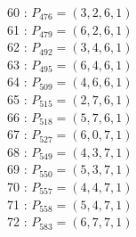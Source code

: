 \documentclass{article}
\begin{document}
{\begin{multicols}{3}
60 : $P_{476}=( 3, 2, 6, 1 )$\\
61 : $P_{479}=( 6, 2, 6, 1 )$\\
62 : $P_{492}=( 3, 4, 6, 1 )$\\
63 : $P_{495}=( 6, 4, 6, 1 )$\\
64 : $P_{509}=( 4, 6, 6, 1 )$\\
65 : $P_{515}=( 2, 7, 6, 1 )$\\
66 : $P_{518}=( 5, 7, 6, 1 )$\\
67 : $P_{527}=( 6, 0, 7, 1 )$\\
68 : $P_{549}=( 4, 3, 7, 1 )$\\
69 : $P_{550}=( 5, 3, 7, 1 )$\\
70 : $P_{557}=( 4, 4, 7, 1 )$\\
71 : $P_{558}=( 5, 4, 7, 1 )$\\
72 : $P_{583}=( 6, 7, 7, 1 )$\\
\end{multicols}


%


%


}%
\end{document}

